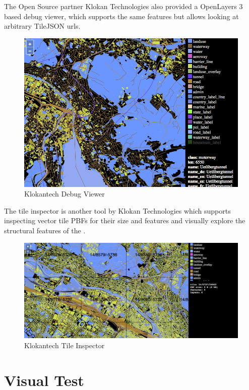 The Open Source partner Klokan Technologies \cite{pm_3_gmbh_2015} also provided a OpenLayers 3\cite{pm_4_openlayers.org_2015} based debug viewer,
which supports the same features but allows looking at arbitrary TileJSON urls.

\begin{figure}[H]
\centering
  \includegraphics[width=1\textwidth]{images/klokantech_debug_viewer.png}
  \caption{Klokantech Debug Viewer}
\end{figure}
The tile inspector is another tool by Klokan Technologies which supports inspecting vector tile PBFs for their size and features and visually explore the structural features of the .

\begin{figure}[H]
\centering
  \includegraphics[width=1\textwidth]{images/klokantech_tile_inspector.png}
  \caption{Klokantech Tile Inspector}
\end{figure}



\section{Visual Test}

